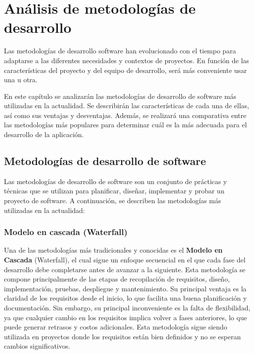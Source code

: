 \chapter{Análisis de metodologías de desarrollo}
\label{cap:analisis_metodologías}

Las metodologías de desarrollo software han evolucionado con el tiempo para adaptarse a las diferentes necesidades 
y contextos de proyectos. En función de las características del proyecto y del equipo de desarrollo,
será más conveniente usar una u otra. 

En este capítulo se analizarán las metodologías de desarrollo de software más utilizadas en la actualidad. 
Se describirán las características de cada una de ellas, así como sus ventajas y desventajas. Además, se realizará una comparativa entre las metodologías más populares 
para determinar cuál es la más adecuada para el desarrollo de la aplicación.

\section{Metodologías de desarrollo de software}
\label{sec:metodologias}

Las metodologías de desarrollo de software son un conjunto de prácticas y técnicas que se utilizan para planificar, diseñar, implementar y probar un proyecto de software. A continuación,
se describen las metodologías más utilizadas en la actualidad:

\subsection{Modelo en cascada (Waterfall)}
\label{subsec:waterfall}

Una de las metodologías más tradicionales y conocidas es el \textbf{Modelo en Cascada} (Waterfall), el cual sigue un enfoque secuencial en el que cada fase del 
desarrollo debe completarse antes de avanzar a la siguiente. Esta metodología se compone principalmente de las etapas de recopilación de requisitos, diseño, implementación, pruebas, despliegue y mantenimiento. 
Su principal ventaja es la claridad de los requisitos desde el inicio, lo que facilita una buena planificación y documentación. Sin embargo, su principal inconveniente
es la falta de flexibilidad, ya que cualquier cambio en los requisitos implica volver a fases anteriores, lo que puede
generar retrasos y costos adicionales. Esta metodología sigue siendo utilizada en proyectos donde los requisitos 
están bien definidos y no se esperan cambios significativos. \cite{sommerville2015}


